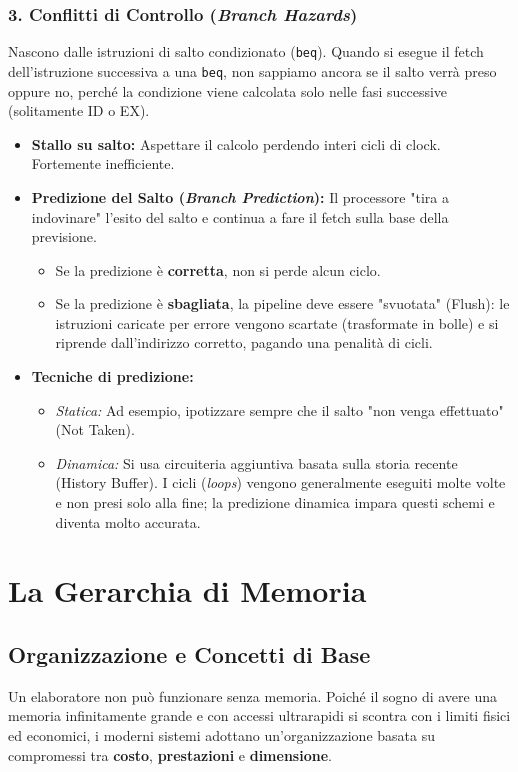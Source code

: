 \documentclass[12pt, a4paper]{article}
\begin{document}
\subsubsection{3. Conflitti di Controllo (\textit{Branch Hazards})}
Nascono dalle istruzioni di salto condizionato (\texttt{beq}). Quando si esegue il fetch dell'istruzione successiva a una \texttt{beq}, non sappiamo ancora se il salto verrà preso oppure no, perché la condizione viene calcolata solo nelle fasi successive (solitamente ID o EX).
\begin{itemize}
    \item \textbf{Stallo su salto:} Aspettare il calcolo perdendo interi cicli di clock. Fortemente inefficiente.
    \item \textbf{Predizione del Salto (\textit{Branch Prediction}):} Il processore "tira a indovinare" l'esito del salto e continua a fare il fetch sulla base della previsione.
    \begin{itemize}
        \item Se la predizione è \textbf{corretta}, non si perde alcun ciclo.
        \item Se la predizione è \textbf{sbagliata}, la pipeline deve essere "svuotata" (Flush): le istruzioni caricate per errore vengono scartate (trasformate in bolle) e si riprende dall'indirizzo corretto, pagando una penalità di cicli.
    \end{itemize}
    \item \textbf{Tecniche di predizione:}
    \begin{itemize}
        \item \textit{Statica:} Ad esempio, ipotizzare sempre che il salto "non venga effettuato" (Not Taken).
        \item \textit{Dinamica:} Si usa circuiteria aggiuntiva basata sulla storia recente (History Buffer). I cicli (\textit{loops}) vengono generalmente eseguiti molte volte e non presi solo alla fine; la predizione dinamica impara questi schemi e diventa molto accurata.
    \end{itemize}
\end{itemize}

\section{La Gerarchia di Memoria}

\subsection{Organizzazione e Concetti di Base}
Un elaboratore non può funzionare senza memoria. Poiché il sogno di avere una memoria infinitamente grande e con accessi ultrarapidi si scontra con i limiti fisici ed economici, i moderni sistemi adottano un'organizzazione basata su compromessi tra \textbf{costo}, \textbf{prestazioni} e \textbf{dimensione}.
\end{document}
